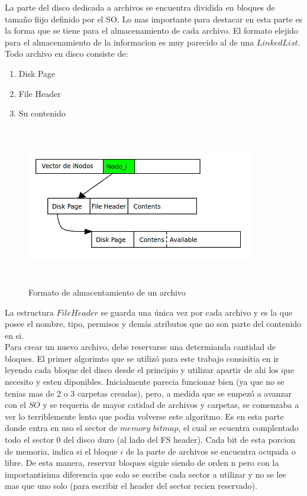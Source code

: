 \documentclass[english]{article}
\begin{document}
La parte del disco dedicada a archivos se encuentra dividida en bloques
de tamaño fiijo definido por el SO. Lo mas importante para destacar
en esta parte es la forma que se tiene para el almacenamiento de cada
archivo. El formato elejido para el almacenamiento de la informacion
es muy parecido al de una $LinkedList$. Todo archivo en disco consiste
de:
\begin{enumerate}
\item Disk Page
\item File Header
\item Su contenido
\end{enumerate}
\begin{figure}[H]
\includegraphics[width=10cm,height=7cm,keepaspectratio]{Archivo}

\caption{Formato de almacentamiento de un archivo}


\end{figure}


La estructura $File$$Header$ se guarda una única vez por cada archivo
y es la que posee el nombre, tipo, permisos y demás atributos que
no son parte del contenido en si.\\


Para crear un nuevo archivo, debe reservarse una determianda cantidad
de bloques. El primer algorimto que se utilizó para este trabajo consisitia
en ir leyendo cada bloque del disco desde el principio y utilizar
apartir de ahi los que necesito y esten diponibles. Inicialmente parecia
funcionar bien (ya que no se tenias mas de 2 o 3 carpetas creadas),
pero, a medida que se empezó a avanzar con el $SO$ y se requeria
de mayor catidad de archivos y carpetas, se comenzaba a ver lo terriblemente
lento que podia volverse este algoritmo. Es en esta parte donde entra
en uso el sector de $memory$ $bitmap$, el cual se ecuentra complentado
todo el sector 0 del disco duro (al lado del FS header). Cada bit
de esta porcion de memoria, indica si el bloque $i$ de la parte de
archivos se encuentra ocupada o libre. De esta manera, reservar bloques
siguie siendo de orden n pero con la importantisima diferencia que
solo se escribe cada sector a utilizar y no se lee mas que uno solo
(para escribir el header del sector recien reservado).
\end{document}
